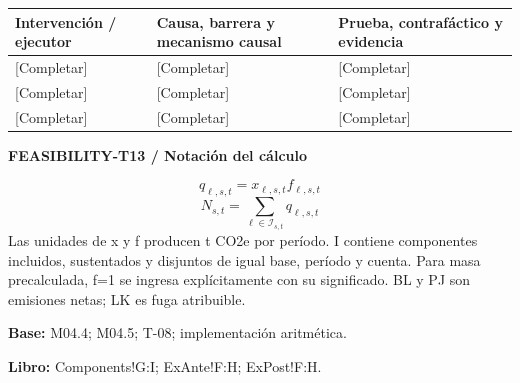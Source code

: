 {\sffamily\fontsize{8.3}{10.3}\selectfont\begin{longtable}{@{}P{51.14mm} P{57.74mm} P{56.09mm}@{}}
\toprule
\textbf{Intervención / ejecutor} & \textbf{Causa, barrera y mecanismo causal} & \textbf{Prueba, contrafáctico y evidencia}\\\midrule\endhead
\rule{0pt}{7.7mm}[Completar] & [Completar] & [Completar]\\\hline
\rule{0pt}{7.7mm}[Completar] & [Completar] & [Completar]\\\hline
\rule{0pt}{7.7mm}[Completar] & [Completar] & [Completar]\\\hline
\end{longtable}}
\par\begingroup\sffamily\fontsize{8}{10}\selectfont\color{NEBGreen}\setlength{\parskip}{2pt}\setlength{\abovedisplayskip}{4pt}\setlength{\belowdisplayskip}{4pt}\setlength{\abovedisplayshortskip}{2pt}\setlength{\belowdisplayshortskip}{3pt}
\textbf{FEASIBILITY-T13 / Notación del cálculo}\par
{\fontsize{9}{11}\selectfont\[ q_{\ell,s,t}=x_{\ell,s,t}f_{\ell,s,t} \]}
{\fontsize{9}{11}\selectfont\[ N_{s,t}=\sum_{\ell\in\mathcal I_{s,t}}q_{\ell,s,t} \]}
Las unidades de x y f producen t CO2e por período. I contiene componentes incluidos, sustentados y disjuntos de igual base, período y cuenta. Para masa precalculada, f=1 se ingresa explícitamente con su significado. BL y PJ son emisiones netas; LK es fuga atribuible.\par
\textbf{Base:} M04.4; M04.5; T-08; implementación aritmética.\par
\textbf{Libro:} Components!G:I; ExAnte!F:H; ExPost!F:H.\par\endgroup
